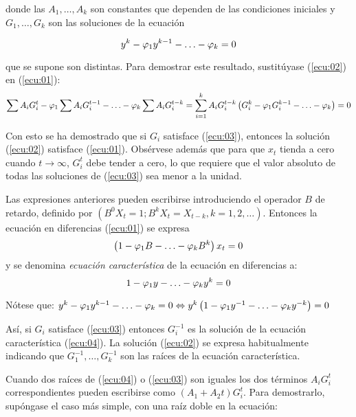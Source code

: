 donde las $A_{1},\ldots, A_{k}$ son constantes que dependen de las condiciones iniciales y $G_{1},\ldots,G_{k}$ son las soluciones de la ecuaci\'{o}n

\begin{equation}{
\label{ecu:03}
y^{k}-\varphi_{1} y^{k-1}-\mathellipsis -\varphi_{k}=0}
\end{equation}

que se supone son distintas. Para demostrar este resultado, sustit\'{u}yase (\ref{ecu:02}) en (\ref{ecu:01}):
\[
\sum {A_{i} G_{i}^{t} -\varphi_{1} \sum {A_{i} G_{i}^{t-1} -\mathellipsis -\varphi_{k} \sum {A_{i} G_{i}^{t-k} } =\sum\limits_{i=1}^k {A_{i} G_{i}^{t-k} \left( {G_{i}^{k} -\varphi_{1} G_{i}^{k-1} -\mathellipsis -\varphi_{k} } \right)=0} } } 
\]

Con esto se ha demostrado que si $G_{i}$ satisface (\ref{ecu:03}), entonces la soluci\'{o}n (\ref{ecu:02}) satisface (\ref{ecu:01}). Obs\'{e}rvese adem\'{a}s que para que $x_{t}$ tienda a cero cuando $t\to \infty$, $G_{i}^{t}$ debe tender a cero, lo que requiere que el valor absoluto de todas las soluciones de (\ref{ecu:03}) sea menor a la unidad. 

Las expresiones anteriores pueden escribirse introduciendo el operador $B$ de retardo, definido por $(B^{0}X_{t} =1; B^{k}X_{t} =X_{t-k}, k=1,2,\ldots)$. Entonces la ecuaci\'{o}n en diferencias (\ref{ecu:01}) se expresa
\[
\left( {1-\varphi_{1} B-\mathellipsis -\varphi_{k} B^{k}} \right)x_{t} =0
\]
y se denomina \textit{ecuaci\'{o}n caracter\'{i}stica} de la ecuaci\'{o}n en diferencias a:
\begin{equation}{
\label{ecu:04}
1-\varphi_{1} y-\mathellipsis -\varphi_{k} y^{k}=0}
\end{equation}

N\'{o}tese que: $y^{k}-\varphi_{1} y^{k-1}-\mathellipsis -\varphi_{k} =0\Leftrightarrow y^{k}\left( {1-\varphi_{1} y^{-1}-\mathellipsis -\varphi_{k} y^{-k}} \right)=0$

As\'{i}, si $G_{i}$ satisface (\ref{ecu:03}) entonces $G_{i}^{-1}$ es la soluci\'{o}n de la ecuaci\'{o}n caracter\'{i}stica (\ref{ecu:04}). La soluci\'{o}n (\ref{ecu:02}) se expresa habitualmente indicando que $G_{1}^{-1},\ldots,G_{k}^{-1}$ son las ra\'{i}ces de la ecuaci\'{o}n caracter\'{i}stica.\newline

Cuando dos ra\'{i}ces de (\ref{ecu:04}) o (\ref{ecu:03}) son iguales los dos t\'{e}rminos $A_{i} G_{i}^{t} $ correspondientes pueden escribirse como $\left( {A_{1} +A_{2} t} \right) G_{i}^{t}$. Para demostrarlo, sup\'{o}ngase el caso m\'{a}s simple, con una ra\'{i}z doble en la ecuaci\'{o}n:


